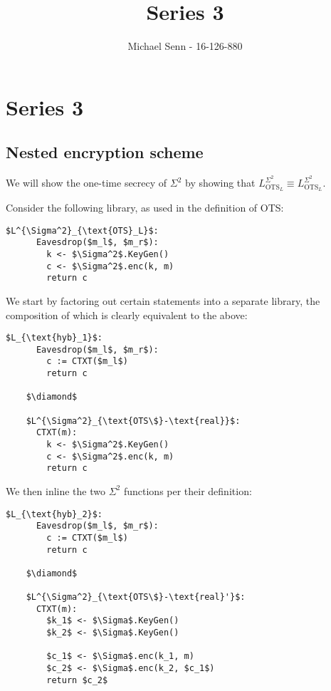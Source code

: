 \documentclass[a4paper]{scrreprt}
\title{Series 3}
\author{Michael Senn \maillink{michael.senn@students.unibe.ch} - 16-126-880}
\date{\printdate}
\begin{document}
\maketitle


\setcounter{chapter}{2}
\chapter{Series 3}

\section{Nested encryption scheme}

We will show the one-time secrecy of $\Sigma^2$ by showing that
$L^{\Sigma^2}_{\text{OTS}_L} \equiv L^{\Sigma^2}_{\text{OTS}_L}$.

Consider the following library, as used in the definition of OTS:

\begin{lstlisting}[mathescape=true, frame=single]
	$L^{\Sigma^2}_{\text{OTS}_L}$:
	  Eavesdrop($m_l$, $m_r$):
	    k <- $\Sigma^2$.KeyGen()
	    c <- $\Sigma^2$.enc(k, m)
	    return c
\end{lstlisting}	

We start by factoring out certain statements into a separate library, the
composition of which is clearly equivalent to the above:

\begin{lstlisting}[mathescape=true, frame=single]
	$L_{\text{hyb}_1}$:
	  Eavesdrop($m_l$, $m_r$):
	    c := CTXT($m_l$)
	    return c

	$\diamond$

	$L^{\Sigma^2}_{\text{OTS\$}-\text{real}}$:
	  CTXT(m):
	    k <- $\Sigma^2$.KeyGen()
	    c <- $\Sigma^2$.enc(k, m)
	    return c
\end{lstlisting}	

We then inline the two $\Sigma^2$ functions per their definition:

\begin{lstlisting}[mathescape=true, frame=single]
	$L_{\text{hyb}_2}$:
	  Eavesdrop($m_l$, $m_r$):
	    c := CTXT($m_l$)
	    return c

	$\diamond$

	$L^{\Sigma^2}_{\text{OTS\$}-\text{real}'}$:
	  CTXT(m):
	    $k_1$ <- $\Sigma$.KeyGen()
	    $k_2$ <- $\Sigma$.KeyGen()

	    $c_1$ <- $\Sigma$.enc(k_1, m)
	    $c_2$ <- $\Sigma$.enc(k_2, $c_1$)
	    return $c_2$
\end{lstlisting}	
\end{document}
